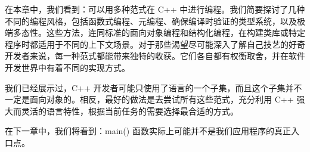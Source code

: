 在本章中，我们看到：可以用多种范式在 C++ 中进行编程。我们简要探讨了几种不同的编程风格，包括函数式编程、元编程、确保编译时验证的类型系统，以及极端多态性。这些方法，连同标准的面向对象编程和结构化编程，在构建类库或特定程序时都适用于不同的上下文场景。对于那些渴望尽可能深入了解自己技艺的好奇开发者来说，每一种范式都能带来独特的收获。它们各自都有权衡取舍，并在软件开发世界中有着不同的实现方式。

我们已经展示过，C++ 开发者可能只使用了语言的一个子集，而且这个子集并不一定是面向对象的。相反，最好的做法是去尝试所有这些范式，充分利用 C++ 强大而灵活的语言特性，根据当前任务的需要选择最合适的方式。

在下一章中，我们将看到：main() 函数实际上可能并不是我们应用程序的真正入口点。